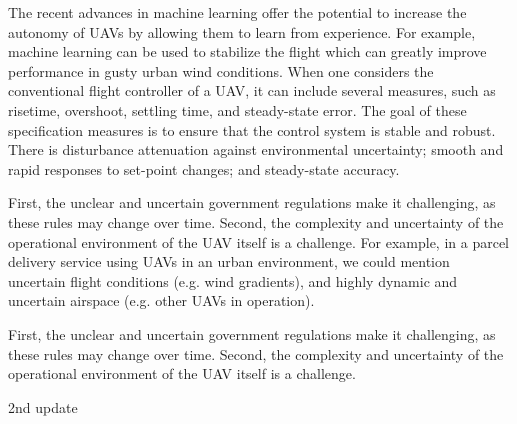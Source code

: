 \documentclass[sigconf]{acmart}
\begin{document}
The recent advances in machine learning offer the potential to increase the autonomy of UAVs by allowing them to learn from experience. For example, machine learning can be used to stabilize the flight which can greatly improve performance in gusty urban wind conditions. 
When one considers the conventional flight controller of a UAV, it can include several measures, such as risetime, overshoot, settling time, and steady-state error.
The goal of these specification measures is to ensure that the control system is stable and robust. 
There is disturbance attenuation against environmental uncertainty; smooth and rapid responses to set-point changes; and steady-state accuracy. 

First, the unclear and uncertain government regulations make it challenging, as these rules may change over time. 
Second, the complexity and uncertainty of the operational environment of the UAV itself is a challenge. 
For example, in a parcel delivery service using UAVs in an urban environment, we could mention uncertain flight conditions (e.g. wind gradients), and highly dynamic and uncertain airspace (e.g. other UAVs in operation). 

First, the unclear and uncertain government regulations make it challenging, as these rules may change over time. 
Second, the complexity and uncertainty of the operational environment of the UAV itself is a challenge. 

2nd update
\end{document}
